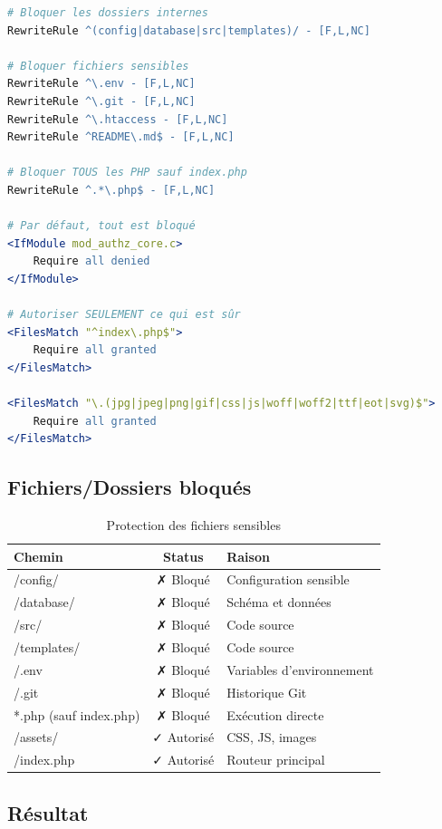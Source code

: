 \documentclass[11pt,a4paper,french]{report}
\begin{document}
\begin{lstlisting}[language=Apache]
# Bloquer les dossiers internes
RewriteRule ^(config|database|src|templates)/ - [F,L,NC]

# Bloquer fichiers sensibles
RewriteRule ^\.env - [F,L,NC]
RewriteRule ^\.git - [F,L,NC]
RewriteRule ^\.htaccess - [F,L,NC]
RewriteRule ^README\.md$ - [F,L,NC]

# Bloquer TOUS les PHP sauf index.php
RewriteRule ^.*\.php$ - [F,L,NC]

# Par défaut, tout est bloqué
<IfModule mod_authz_core.c>
    Require all denied
</IfModule>

# Autoriser SEULEMENT ce qui est sûr
<FilesMatch "^index\.php$">
    Require all granted
</FilesMatch>

<FilesMatch "\.(jpg|jpeg|png|gif|css|js|woff|woff2|ttf|eot|svg)$">
    Require all granted
</FilesMatch>
\end{lstlisting}

\subsection{Fichiers/Dossiers bloqués}

\begin{table}[H]
\centering
\caption{Protection des fichiers sensibles}
\begin{tabular}{|l|c|l|}
\hline
\textbf{Chemin} & \textbf{Status} & \textbf{Raison} \\
\hline
/config/ & ✗ Bloqué & Configuration sensible \\
\hline
/database/ & ✗ Bloqué & Schéma et données \\
\hline
/src/ & ✗ Bloqué & Code source \\
\hline
/templates/ & ✗ Bloqué & Code source \\
\hline
/.env & ✗ Bloqué & Variables d'environnement \\
\hline
/.git & ✗ Bloqué & Historique Git \\
\hline
*.php (sauf index.php) & ✗ Bloqué & Exécution directe \\
\hline
/assets/ & ✓ Autorisé & CSS, JS, images \\
\hline
/index.php & ✓ Autorisé & Routeur principal \\
\hline
\end{tabular}
\end{table}

\subsection{Résultat}
\end{document}
